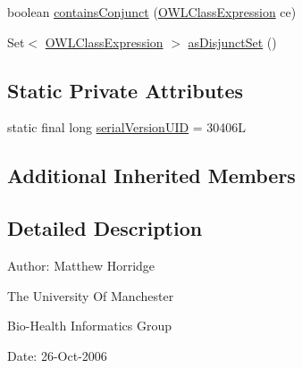 \begin{DoxyCompactItemize}
\item 
boolean \hyperlink{classuk_1_1ac_1_1manchester_1_1cs_1_1owl_1_1owlapi_1_1_o_w_l_anonymous_class_expression_impl_a4dc899abcd08af2b498531da4e7fb16c}{contains\-Conjunct} (\hyperlink{interfaceorg_1_1semanticweb_1_1owlapi_1_1model_1_1_o_w_l_class_expression}{O\-W\-L\-Class\-Expression} ce)
\item 
Set$<$ \hyperlink{interfaceorg_1_1semanticweb_1_1owlapi_1_1model_1_1_o_w_l_class_expression}{O\-W\-L\-Class\-Expression} $>$ \hyperlink{classuk_1_1ac_1_1manchester_1_1cs_1_1owl_1_1owlapi_1_1_o_w_l_anonymous_class_expression_impl_a7abc2565ed00c933a4fc24ad63cf8f7f}{as\-Disjunct\-Set} ()
\end{DoxyCompactItemize}
\subsection*{Static Private Attributes}
\begin{DoxyCompactItemize}
\item 
static final long \hyperlink{classuk_1_1ac_1_1manchester_1_1cs_1_1owl_1_1owlapi_1_1_o_w_l_anonymous_class_expression_impl_a7f17900b9989229de869dcd69652a2eb}{serial\-Version\-U\-I\-D} = 30406\-L
\end{DoxyCompactItemize}
\subsection*{Additional Inherited Members}


\subsection{Detailed Description}
Author\-: Matthew Horridge\par
 The University Of Manchester\par
 Bio-\/\-Health Informatics Group\par
 Date\-: 26-\/\-Oct-\/2006\par
\par
 

